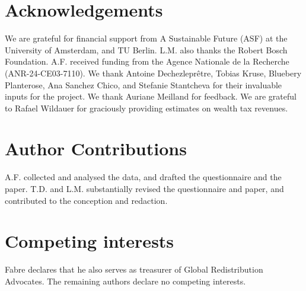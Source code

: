 \begin{small}
\section*{\normalsize Acknowledgements}

We are grateful for financial support from A Sustainable Future (ASF) at the University of Amsterdam, and TU Berlin. L.M. also thanks the Robert Bosch Foundation. A.F. received funding from the Agence Nationale de la Recherche (ANR-24-CE03-7110). %
We thank Antoine Dechezleprêtre, Tobias Kruse, Bluebery Planterose, Ana Sanchez Chico, and Stefanie Stantcheva for their invaluable inputs for the project. We thank Auriane Meilland for feedback. We are grateful to Rafael Wildauer for graciously providing estimates on wealth tax revenues. %

\section*{\normalsize Author Contributions} A.F. collected and analysed the data, and drafted the questionnaire and the paper. T.D. and L.M. substantially revised the questionnaire and paper, and contributed to the conception and redaction.

\section*{\normalsize Competing interests} Fabre declares that he also serves as treasurer of Global Redistribution Advocates. The remaining authors declare no competing interests. %




\end{small}  %

